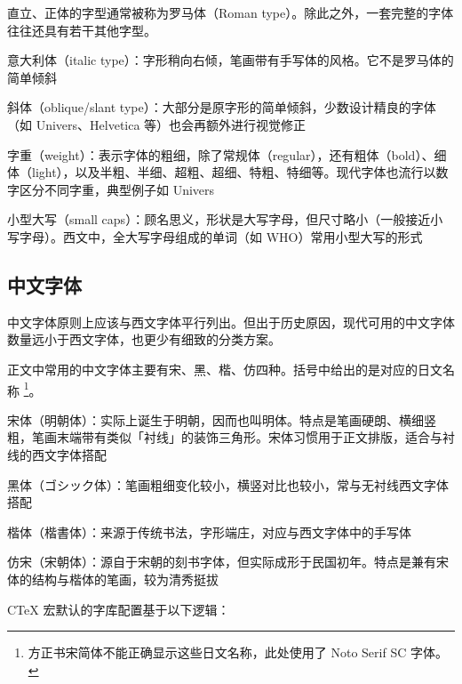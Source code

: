 直立、正体的字型通常被称为罗马体（Roman type）。除此之外，一套完整的字体往往还具有若干其他字型。

\begin{compactitems}
  \item 意大利体（italic type）：字形稍向右倾，笔画带有手写体的风格。它不是罗马体的简单倾斜
  \item 斜体（oblique/slant type）：大部分是原字形的简单倾斜，少数设计精良的字体（如 Univers、Helvetica 等）也会再额外进行视觉修正
  \item 字重（weight）：表示字体的粗细，除了常规体（regular），还有粗体（bold）、细体（light），以及半粗、半细、超粗、超细、特粗、特细等。现代字体也流行以数字区分不同字重，典型例子如 Univers
  \item 小型大写（small caps）：顾名思义，形状是大写字母，但尺寸略小（一般接近小写字母）。西文中，全大写字母组成的单词（如 WHO）常用小型大写的形式
\end{compactitems}

\subsection{中文字体}

中文字体原则上应该与西文字体平行列出。但出于历史原因，现代可用的中文字体数量远小于西文字体，也更少有细致的分类方案。

正文中常用的中文字体主要有宋、黑、楷、仿四种。括号中给出的是对应的日文名称
\footnote{方正书宋简体不能正确显示这些日文名称，此处使用了 Noto Serif SC 字体。}。

\begin{compactitems}
  \item 宋体（{\notoserifsc 明朝体}）：实际上诞生于明朝，因而也叫明体。特点是笔画硬朗、横细竖粗，笔画末端带有类似「衬线」的装饰三角形。宋体习惯用于正文排版，适合与衬线的西文字体搭配
  \item 黑体（{\notoserifsc ゴシック体}）：笔画粗细变化较小，横竖对比也较小，常与无衬线西文字体搭配
  \item 楷体（{\notoserifsc 楷書体}）：来源于传统书法，字形端庄，对应与西文字体中的手写体
  \item 仿宋（{\notoserifsc 宋朝体}）：源自于宋朝的刻书字体，但实际成形于民国初年。特点是兼有宋体的结构与楷体的笔画，较为清秀挺拔
\end{compactitems}

CTeX 宏默认的字库配置基于以下逻辑：

